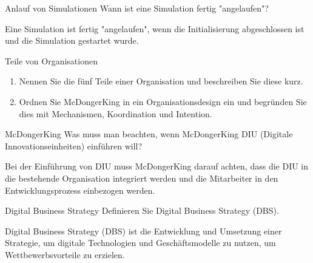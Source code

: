 \documentclass{article}
\begin{document}
\begin{exercise}{Anlauf von Simulationen}
  Wann ist eine Simulation fertig "angelaufen"?

  \begin{solution}
    Eine Simulation ist fertig "angelaufen", wenn die Initialisierung abgeschlossen ist und die Simulation gestartet wurde.
  \end{solution}
\end{exercise}

\begin{exercise}{Teile von Organisationen}
  \begin{enumerate}
    \item Nennen Sie die fünf Teile einer Organisation und beschreiben Sie diese kurz.
    \item Ordnen Sie McDongerKing in ein Organisationsdesign ein und begründen Sie dies mit Mechanismen, Koordination und Intention.
  \end{enumerate}

  \begin{solution}
  \end{solution}
\end{exercise}

\begin{exercise}{McDongerKing}
  Was muss man beachten, wenn McDongerKing DIU (Digitale Innovationseinheiten) einführen will?

  \begin{solution}
    Bei der Einführung von DIU muss McDongerKing darauf achten, dass die DIU in die bestehende Organisation integriert werden und die Mitarbeiter in den Entwicklungsprozess einbezogen werden.
  \end{solution}
\end{exercise}

\begin{exercise}{Digital Business Strategy}
  Definieren Sie Digital Business Strategy (DBS).

  \begin{solution}
    Digital Business Strategy (DBS) ist die Entwicklung und Umsetzung einer Strategie, um digitale Technologien und Geschäftsmodelle zu nutzen, um Wettbewerbsvorteile zu erzielen.
  \end{solution}
\end{exercise}
\end{document}
